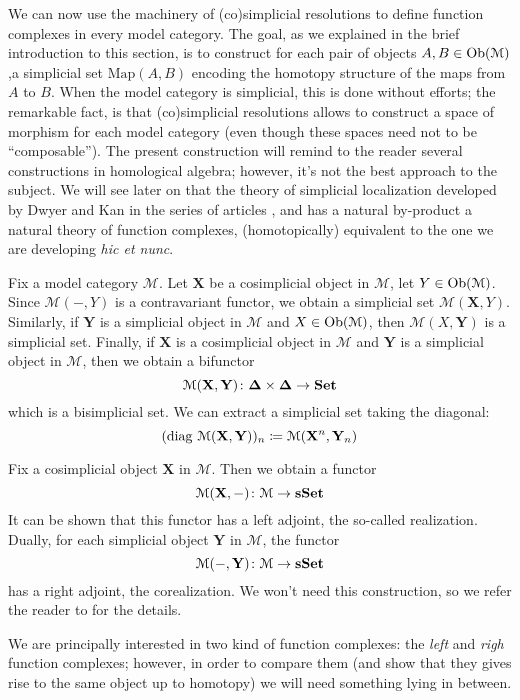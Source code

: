 \begin{refsection}
We can now use the machinery of (co)simplicial resolutions to define function complexes in every model category. The goal, as we explained in the brief introduction to this section, is to construct for each pair of objects $A,B \in \operatorname{Ob}(\mathcal M)$,a simplicial set $\mathrm{Map}(A,B)$ encoding the homotopy structure of the maps from $A$ to $B$. When the model category is simplicial, this is done without efforts; the remarkable fact, is that (co)simplicial resolutions allows to construct a space of morphism for each model category (even though these spaces need not to be ``composable''). The present construction will remind to the reader several constructions in homological algebra; however, it's not the best approach to the subject. We will see later on that the theory of simplicial localization developed by Dwyer and Kan in the series of articles \cite{dksimplicial}, \cite{dkcomputing} and \cite{dkfunction} has a natural by-product a natural theory of function complexes, (homotopically) equivalent to the one we are developing \emph{hic et nunc}.

Fix a model category $\mathcal M$. Let $\mathbf{X}$ be a cosimplicial object in $\mathcal M$, let $Y \in \operatorname{Ob}(\mathcal M)$. Since $\mathcal M(-,Y)$ is a contravariant functor, we obtain a simplicial set $\mathcal M(\mathbf X,Y)$. Similarly, if $\mathbf Y$ is a simplicial object in $\mathcal M$ and $X \in \operatorname{Ob}(\mathcal M)$, then $\mathcal M(X,\mathbf Y)$ is a simplicial set. Finally, if $\mathbf X$ is a cosimplicial object in $\mathcal M$ and $\mathbf Y$ is a simplicial object in $\mathcal M$, then we obtain a bifunctor
\[
\mathcal M(\mathbf X,\mathbf Y) \colon \boldsymbol\Delta \times \boldsymbol\Delta \to \mathbf{Set}
\]
which is a bisimplicial set. We can extract a simplicial set taking the diagonal:
\[
(\operatorname{\mathrm{diag} \,} \mathcal M(\mathbf X,\mathbf Y))_n\coloneqq \mathcal M(\mathbf X^n,\mathbf Y_n)
\]

\begin{rmk}
Fix a cosimplicial object $\mathbf X$ in $\mathcal M$. Then we obtain a functor
\[
\mathcal M(\mathbf X, -) \colon \mathcal M \to \mathbf{sSet}
\]
It can be shown that this functor has a left adjoint, the so-called realization. Dually, for each simplicial object $\mathbf Y$ in $\mathcal M$, the functor
\[
\mathcal M(-,\mathbf Y) \colon \mathcal M \to \mathbf{sSet}
\]
has a right adjoint, the corealization. We won't need this construction, so we refer the reader to \cite[Ch. 16.3]{hirschhorn} for the details.
\end{rmk}

We are principally interested in two kind of function complexes: the \emph{left} and \emph{righ} function complexes; however, in order to compare them (and show that they gives rise to the same object up to homotopy) we will need something lying in between.


\end{refsection}

